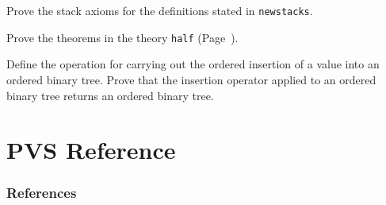 \documentclass[11pt]{article}
\begin{document}
\begin{prob}
  Prove the stack axioms for the definitions stated in {\tt newstacks}.
\end{prob}

\begin{prob}
  Prove the theorems in the theory {\tt half} (Page~\pageref{half}).
\end{prob}

\begin{prob}
  Define the operation for carrying out the ordered insertion of a value
into an ordered binary tree.  Prove that the insertion operator applied
to an ordered binary tree returns an ordered binary tree.
\end{prob}

\setcounter{section}{0}
\newpage
\part{PVS Reference}
\cleardoublepage
\newcommand{\wiftnewpage}{\newpage}
\newcommand{\refnewpage}{}


\newpage
\def\UrlFont{\tt}
\section*{References}


\end{document}
